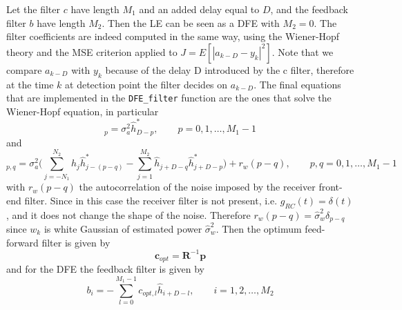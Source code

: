 \documentclass[10pt]{article}
\begin{document}
Let the filter $c$ have length $M_1$ and an added delay equal to $D$, and the feedback filter $b$ have length $M_2$. Then the LE can be seen as a DFE with $M_2 = 0$. The filter coefficients are indeed computed in the same way, using the Wiener-Hopf theory and the MSE criterion applied to $J = E[|a_{k-D} - y_k|^2]$. Note that we compare $a_{k-D}$ with $y_k$ because of the delay D introduced by the c filter, therefore at the time $k$ at detection point the filter decides on $a_{k-D}$. The final equations that are implemented in the \texttt{DFE\_filter} function are the ones that solve the Wiener-Hopf equation, in particular
\begin{equation}
	[\mathbf{p}]_p = \sigma_a^2 \hat{h}^*_{D-p}, \quad \quad p = 0, 1, \dots, M_1 - 1
\end{equation}
and
\begin{equation}
	[\mathbf{R}]_{p, q} = \sigma_a^2 \bigg(\sum_{j = -N_1}^{N_2}\hat{h}_j \hat{h}^*_{j-(p-q)} - \sum_{j = 1}^{M_2} \hat{h}_{j+D-q}\hat{h}^*_{j+D-p} \bigg) + r_{w}(p-q), \quad \quad p,q = 0, 1, \dots, M_1 - 1
\end{equation}
with $r_w(p-q)$ the autocorrelation of the noise imposed by the receiver front-end filter. Since in this case the receiver filter is not present, i.e. $g_{RC}(t) = \delta(t)$, and it does not change the shape of the noise. Therefore $r_w(p-q) = \hat{\sigma}_w^2 \delta_{p-q}$ since $w_k$ is white Gaussian of estimated power $\hat{\sigma}_w^2$. Then the optimum feed-forward filter is given by
\begin{equation}
	\mathbf{c}_{opt} = \mathbf{R}^{-1}\mathbf{p}
\end{equation}
and for the DFE the feedback filter is given by 
\begin{equation}
	b_i = -\sum_{l=0}^{M_1-1} c_{opt, l} \hat{h}_{i+D-l}, \quad \quad i = 1, 2, \dots, M_2
\end{equation}
\end{document}
